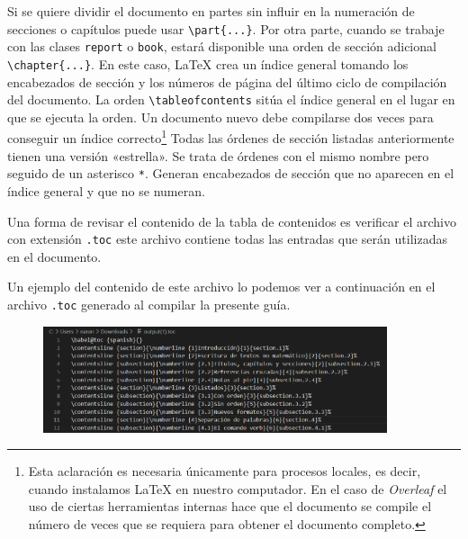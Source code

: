 \documentclass[a4,10pt]{aleph-notas}
\begin{document}
Si se quiere dividir el documento en partes sin influir en la numeración de secciones o capítulos puede usar \verb|\part{...}|. Por otra parte, cuando se trabaje con las clases \texttt{report} o \texttt{book}, estará disponible una orden de sección adicional \verb|\chapter{...}|. En este caso, \LaTeX{} crea un índice general tomando los encabezados de sección y los números de página del último ciclo de compilación del documento.  La orden \verb"\tableofcontents" sitúa el índice general en el lugar en que se ejecuta la orden.  Un documento nuevo debe compilarse dos veces para conseguir un índice correcto\footnote{Esta aclaración es necesaria únicamente para procesos locales, es decir, cuando instalamos \LaTeX{} en nuestro computador. En el caso de \emph{Overleaf} el uso de ciertas herramientas internas hace que el documento se compile el número de veces que se requiera para obtener el documento completo.}
Todas las órdenes de sección listadas anteriormente tienen una versión «estrella».  Se trata de órdenes con el mismo nombre pero seguido de
un asterisco \verb|*|.  Generan encabezados de sección que no aparecen en el índice general y que no se numeran.


\begin{advertencia}
Una forma de revisar el contenido de la tabla de contenidos es verificar el archivo con extensión \texttt{.toc} este archivo contiene todas las entradas que serán utilizadas en el documento.
\end{advertencia}

Un ejemplo del contenido de este archivo lo podemos ver a continuación en el archivo \texttt{.toc} generado al compilar la presente guía.

\begin{figure}[H]
    \centering
    \includegraphics[width=0.90\textwidth]{Imagenes/guia02_1.png}
\end{figure}
\end{document}
